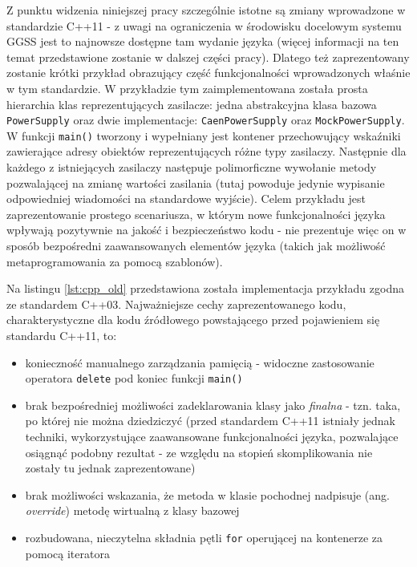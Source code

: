 Z punktu widzenia niniejszej pracy szczególnie istotne są zmiany wprowadzone w standardzie C++11 - z uwagi na ograniczenia w środowisku docelowym systemu GGSS jest to najnowsze dostępne tam wydanie języka (więcej informacji na ten temat przedstawione zostanie w dalszej części pracy). Dlatego też zaprezentowany zostanie krótki przykład obrazujący część funkcjonalności wprowadzonych właśnie w tym standardzie. W przykładzie tym zaimplementowana została prosta hierarchia klas reprezentujących zasilacze: jedna abstrakcyjna klasa bazowa \lstinline{PowerSupply} oraz dwie implementacje: \lstinline{CaenPowerSupply} oraz \lstinline{MockPowerSupply}. W funkcji \lstinline{main()} tworzony i wypełniany jest kontener przechowujący wskaźniki zawierające adresy obiektów reprezentujących różne typy zasilaczy. Następnie dla każdego z istniejących zasilaczy następuje polimorficzne wywołanie metody pozwalającej na zmianę wartości zasilania (tutaj powoduje jedynie wypisanie odpowiedniej wiadomości na standardowe wyjście). Celem przykładu jest zaprezentowanie prostego scenariusza, w którym nowe funkcjonalności języka wpływają pozytywnie na jakość i bezpieczeństwo kodu - nie prezentuje więc on w sposób bezpośredni zaawansowanych elementów języka (takich jak możliwość metaprogramowania za pomocą szablonów).

Na listingu \ref{lst:cpp_old} przedstawiona została implementacja przykładu zgodna ze standardem C++03. Najważniejsze cechy zaprezentowanego kodu, charakterystyczne dla kodu źródłowego powstającego przed pojawieniem się standardu C++11, to: 
\begin{itemize}
\item konieczność manualnego zarządzania pamięcią - widoczne zastosowanie operatora \lstinline{delete} pod koniec funkcji \lstinline{main()}
\item brak bezpośredniej możliwości zadeklarowania klasy jako \emph{finalna} - tzn. taka, po której nie można dziedziczyć (przed standardem C++11 istniały jednak techniki, wykorzystujące zaawansowane funkcjonalności języka, pozwalające osiągnąć podobny rezultat - ze względu na stopień skomplikowania nie zostały tu jednak zaprezentowane)
\item brak możliwości wskazania, że metoda w klasie pochodnej nadpisuje (ang. \emph{override}) metodę wirtualną z klasy bazowej
\item rozbudowana, nieczytelna składnia pętli \lstinline{for} operującej na kontenerze za pomocą iteratora 
\end{itemize}

